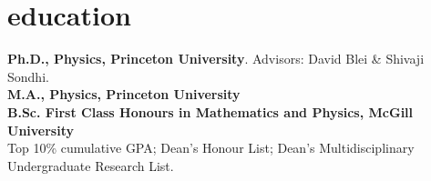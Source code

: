 \documentclass[4pt, letterpaper]{article}
\begin{document}
\section*{education}
\textbf{Ph.D., Physics, Princeton University}. Advisors:
David Blei \& Shivaji Sondhi.\\
\textbf{M.A., Physics, Princeton University}\\
\textbf{B.Sc. First Class Honours in Mathematics and Physics, McGill University}\\
Top 10\% cumulative GPA; Dean's Honour List; Dean's Multidisciplinary Undergraduate Research List.\\
\end{document}
